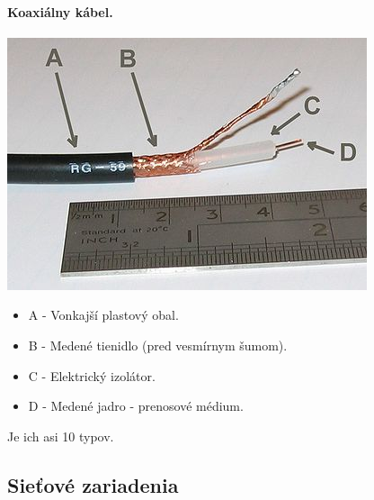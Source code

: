 \documentclass[10pt,a4paper]{article}
\begin{document}
\paragraph{Koaxiálny kábel.}
\begin{center}
\includegraphics{coaxial.jpg}
\end{center}
\begin{itemize}
\item A - Vonkajší plastový obal. 
\item B - Medené tienidlo (pred vesmírnym šumom). 
\item C - Elektrický izolátor.
\item D - Medené jadro - prenosové médium. 
\end{itemize}

Je ich asi 10 typov. 

\subsection{Sieťové zariadenia}           
\end{document}
